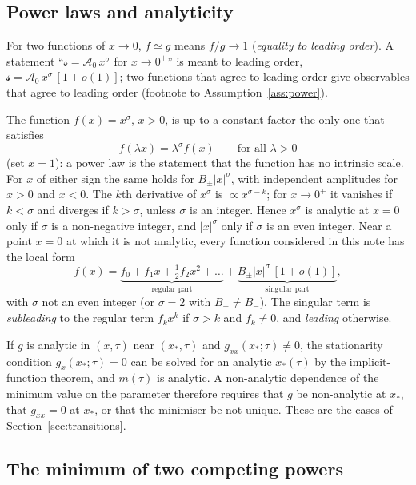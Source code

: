 \documentclass[10pt,a4paper]{article}
\theoremstyle{plain}
\newcommand{\cA}{{\mathcal{A}_0}}   %
\newcommand{\lds}{\mathscr{s}}  %
\begin{document}
\subsection{Power laws and analyticity}
\label{sec:tools_power}

For two functions of $x\to0$, $f\simeq g$ means $f/g\to1$ (\emph{equality to
leading order}). A statement ``$\lds=\cA\,x^{\sigma}$ for $x\to0^{+}$'' is
meant to leading order, $\lds=\cA\,x^{\sigma}\,[1+o(1)]$; two functions that
agree to leading order give observables that agree to leading order
(footnote to Assumption~\ref{ass:power}).

The function $f(x)=x^{\sigma}$, $x>0$, is up to a constant factor the only
one that satisfies
\begin{equation}\label{eq:tools_hom1}
  f(\lambda x)=\lambda^{\sigma}f(x)\qquad\text{for all }\lambda>0
\end{equation}
(set $x=1$): a power law is the statement that the function has no intrinsic
scale. For $x$ of either sign the same holds for $B_\pm|x|^{\sigma}$, with
independent amplitudes for $x>0$ and $x<0$. The $k$th derivative of
$x^{\sigma}$ is $\propto x^{\sigma-k}$; for $x\to0^{+}$ it vanishes if
$k<\sigma$ and diverges if $k>\sigma$, unless $\sigma$ is an integer. Hence
$x^{\sigma}$ is analytic at $x=0$ only if $\sigma$ is a non-negative
integer, and $|x|^{\sigma}$ only if $\sigma$ is an even integer. Near a point
$x=0$ at which it is not analytic, every function considered in this note
has the local form
\begin{equation}\label{eq:tools_local}
  f(x)=\underbrace{f_0+f_1x+\tfrac12f_2x^{2}+\dots}_{\text{regular part}}
  +\underbrace{B_\pm|x|^{\sigma}\,[1+o(1)]}_{\text{singular part}} ,
\end{equation}
with $\sigma$ not an even integer (or $\sigma=2$ with $B_+\neq B_-$). The
singular term is \emph{subleading} to the regular term $f_kx^{k}$ if
$\sigma>k$ and $f_k\neq0$, and \emph{leading} otherwise.

If $g$ is analytic in $(x,\tau)$ near $(x_*,\tau)$ and
$g_{xx}(x_*;\tau)\neq0$, the stationarity condition $g_x(x_*;\tau)=0$ can be
solved for an analytic $x_*(\tau)$ by the implicit-function theorem, and
$m(\tau)$ is analytic. A non-analytic dependence of the minimum value on the
parameter therefore requires that $g$ be non-analytic at $x_*$, that
$g_{xx}=0$ at $x_*$, or that the minimiser be not unique. These are the
cases of Section~\ref{sec:transitions}.

\subsection{The minimum of two competing powers}
\label{sec:tools_min}
\end{document}
